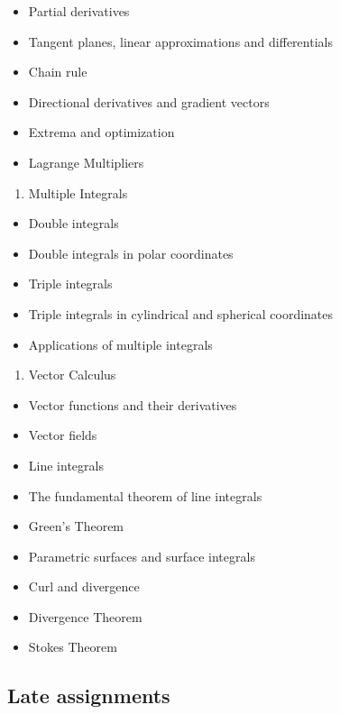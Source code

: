 \documentclass[
]{article}
\providecommand{\tightlist}{%
  \setlength{\itemsep}{0pt}\setlength{\parskip}{0pt}}
\begin{document}
\begin{itemize}
\tightlist
\item
  Partial derivatives
\item
  Tangent planes, linear approximations and differentials
\item
  Chain rule
\item
  Directional derivatives and gradient vectors
\item
  Extrema and optimization
\item
  Lagrange Multipliers
\end{itemize}

\begin{enumerate}
\def\labelenumi{\arabic{enumi}.}
\setcounter{enumi}{2}
\tightlist
\item
  Multiple Integrals
\end{enumerate}

\begin{itemize}
\tightlist
\item
  Double integrals
\item
  Double integrals in polar coordinates
\item
  Triple integrals
\item
  Triple integrals in cylindrical and spherical coordinates
\item
  Applications of multiple integrals
\end{itemize}

\begin{enumerate}
\def\labelenumi{\arabic{enumi}.}
\setcounter{enumi}{3}
\tightlist
\item
  Vector Calculus
\end{enumerate}

\begin{itemize}
\tightlist
\item
  Vector functions and their derivatives
\item
  Vector fields
\item
  Line integrals
\item
  The fundamental theorem of line integrals
\item
  Green's Theorem
\item
  Parametric surfaces and surface integrals
\item
  Curl and divergence
\item
  Divergence Theorem
\item
  Stokes Theorem
\end{itemize}

\hypertarget{late-assignments}{%
\subsection*{Late assignments}\label{late-assignments}}
\end{document}
